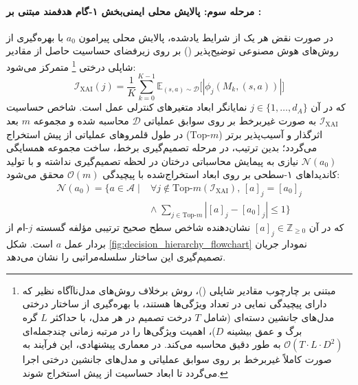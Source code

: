 \documentclass[oneside,openany,phd]{TMU-Thesis}
\begin{document}
\paragraph{مرحله سوم: پالایش محلی ایمنی‌بخش ۱-گام هدفمند مبتنی بر :}
در صورت نقض هر یک از شرایط یادشده، پالایش محلی پیرامون $a_0$ با بهره‌گیری از روش‌های هوش مصنوعی توضیح‌پذیر () بر روی زیرفضای حساسیت حاصل از مقادیر شاپلی درختی \footnote{مبتنی بر چارچوب مقادیر شاپلی \cite{lundberg2017unified} ()، روش  برخلاف روش‌های مدل‌ناآگاه نظیر  که دارای پیچیدگی نمایی در تعداد ویژگی‌ها هستند، با بهره‌گیری از ساختار درختی مدل‌های جانشین دسته‌ای (شامل $T$ درخت تصمیم در هر مدل، با حداکثر $L$ گره برگ و عمق بیشینه $D$)، اهمیت ویژگی‌ها را در مرتبه زمانی چندجمله‌ای $\mathcal{O}(T \cdot L \cdot D^2)$ به طور دقیق محاسبه می‌کند. در معماری پیشنهادی، این فرآیند به صورت کاملاً غیربرخط بر روی سوابق عملیاتی و مدل‌های جانشین درختی اجرا می‌گردد تا ابعاد حساسیت از پیش استخراج شوند.} متمرکز می‌شود:
\begin{equation}
\label{eq:shap_projection}
\mathcal{I}_{\text{XAI}}(j) = \frac{1}{K} \sum_{k=0}^{K-1} \mathbb{E}_{(s, a) \sim \mathcal{D}} \big[ |\phi_j(M_k, (s, a))| \big]
\end{equation}
که در آن $j \in \{1, \dots, d_A\}$ نمایانگر ابعاد متغیرهای کنترلی عمل است. شاخص حساسیت $\mathcal{I}_{\text{XAI}}$ به صورت غیربرخط بر روی سوابق عملیاتی $\mathcal{D}$ محاسبه شده و مجموعه $m$ بعد اثرگذار و آسیب‌پذیر برتر ($\text{Top-}m$) در طول قلمروهای عملیاتی از پیش استخراج می‌گردد؛ بدین ترتیب، در مرحله تصمیم‌گیری برخط، ساخت مجموعه همسایگی $\mathcal{N}(a_0)$ نیازی به پیمایش محاسباتی درختان در لحظه تصمیم‌گیری نداشته و با تولید کاندیداهای ۱-سطحی بر روی ابعاد استخراج‌شده با پیچیدگی $\mathcal{O}(m)$ محقق می‌شود:
\begin{equation}
\label{eq:xai_neighborhood}
\begin{aligned}
\mathcal{N}(a_0) = \bigg\{ a \in \mathcal{A} \;\bigg|\; &\forall j \notin \text{Top-}m(\mathcal{I}_{\text{XAI}}),\, [a]_j = [a_0]_j \\
&\land\; \sum_{j \in \text{Top-}m} |[a]_j - [a_0]_j| \le 1 \bigg\}
\end{aligned}
\end{equation}
که در آن $[a]_j \in \mathbb{Z}_{\ge 0}$ نشان‌دهنده شاخص سطح صحیح ترتیبی مؤلفه گسسته $j$-ام از بردار عمل $a$ است.
شکل \ref{fig:decision_hierarchy_flowchart} نمودار جریان تصمیم‌گیری این ساختار سلسله‌مراتبی را نشان می‌دهد.
\end{document}
